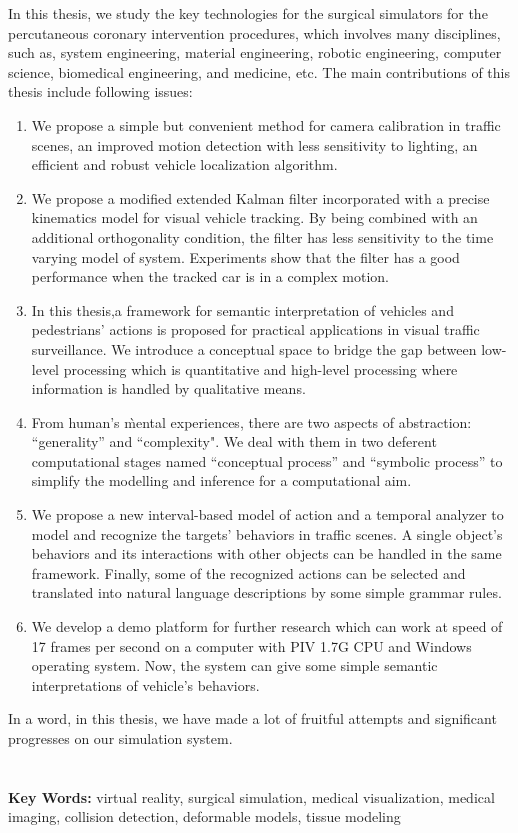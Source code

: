 In this thesis, we study the key technologies for the surgical simulators for the 
percutaneous coronary intervention procedures, which involves many disciplines, 
such as, system engineering, material engineering, robotic engineering, computer 
science, biomedical engineering, and medicine, etc. The main contributions of 
this thesis include following issues:
\begin{enumerate}
    \item We propose a simple but convenient method for camera calibration in
    traffic scenes, an improved motion detection with less sensitivity to lighting,
    an efficient and robust vehicle localization algorithm.
    \item We propose a modified extended Kalman filter incorporated with a precise
    kinematics model for visual vehicle tracking. By being combined with an additional orthogonality
    condition, the filter has less sensitivity to the time varying model of system. Experiments
    show that the filter has a good performance when the tracked car is in a complex motion.
    \item In this thesis,a framework for semantic interpretation of vehicles and pedestrians'
    actions is proposed for practical applications in visual traffic surveillance.  We introduce
    a conceptual space to bridge the gap between low-level processing which is quantitative
    and high-level processing where information is handled by qualitative means.
    \item From human's \`mental experiences, there are two aspects of abstraction: ``generality'' and
    ``complexity". We deal with them in two deferent computational stages named ``conceptual process'' and ``symbolic process'' to
    simplify the modelling and inference for a computational aim.
    \item We propose a new interval-based model of action and a temporal analyzer to model and
    recognize the targets' behaviors in traffic scenes. A single object's behaviors and its
    interactions with other objects can be handled in the same framework. Finally, some of the recognized
    actions can be selected and translated into natural language descriptions by some simple grammar
    rules.
    \item We develop a demo platform for further research which can work at
    speed of 17 frames per second on a computer with PIV 1.7G CPU and Windows
    operating system. Now, the system can give some simple semantic interpretations
    of vehicle's behaviors.
\end{enumerate}

In a word, in this thesis, we have made a lot of fruitful attempts and significant
progresses on our simulation system.
\\
\\
\\
\noindent \textbf{Key Words:} virtual reality, surgical simulation, medical 
visualization, medical imaging, collision detection, deformable models, tissue modeling

